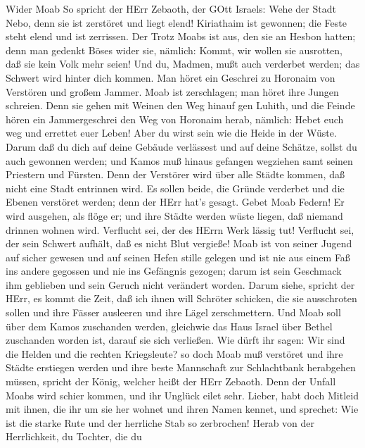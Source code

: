  Wider Moab So spricht der HErr Zebaoth, der GOtt Israels:
Wehe der Stadt Nebo, denn sie ist zerstöret und liegt elend! Kiriathaim
ist gewonnen; die Feste steht elend und ist zerrissen.  Der
Trotz Moabs ist aus, den sie an Hesbon hatten; denn man gedenkt Böses
wider sie, nämlich: Kommt, wir wollen sie ausrotten, daß sie kein Volk
mehr seien! Und du, Madmen, mußt auch verderbet werden; das Schwert wird
hinter dich kommen.  Man höret ein Geschrei zu Horonaim von
Verstören und großem Jammer.  Moab ist zerschlagen; man
höret ihre Jungen schreien.  Denn sie gehen mit Weinen den
Weg hinauf gen Luhith, und die Feinde hören ein Jammergeschrei den Weg
von Horonaim herab,  nämlich: Hebet euch weg und errettet
euer Leben! Aber du wirst sein wie die Heide in der Wüste. 
Darum daß du dich auf deine Gebäude verlässest und auf deine Schätze,
sollst du auch gewonnen werden; und Kamos muß hinaus gefangen wegziehen
samt seinen Priestern und Fürsten.  Denn der Verstörer wird
über alle Städte kommen, daß nicht eine Stadt entrinnen wird. Es sollen
beide, die Gründe verderbet und die Ebenen verstöret werden; denn der
HErr hat's gesagt.  Gebet Moab Federn! Er wird ausgehen, als
flöge er; und ihre Städte werden wüste liegen, daß niemand drinnen
wohnen wird.  Verflucht sei, der des HErrn Werk lässig tut!
Verflucht sei, der sein Schwert aufhält, daß es nicht Blut vergieße!
 Moab ist von seiner Jugend auf sicher gewesen und auf
seinen Hefen stille gelegen und ist nie aus einem Faß ins andere
gegossen und nie ins Gefängnis gezogen; darum ist sein Geschmack ihm
geblieben und sein Geruch nicht verändert worden.  Darum
siehe, spricht der HErr, es kommt die Zeit, daß ich ihnen will Schröter
schicken, die sie ausschroten sollen und ihre Fässer ausleeren und ihre
Lägel zerschmettern.  Und Moab soll über dem Kamos
zuschanden werden, gleichwie das Haus Israel über Bethel zuschanden
worden ist, darauf sie sich verließen.  Wie dürft ihr
sagen: Wir sind die Helden und die rechten Kriegsleute?  so
doch Moab muß verstöret und ihre Städte erstiegen werden und ihre beste
Mannschaft zur Schlachtbank herabgehen müssen, spricht der König,
welcher heißt der HErr Zebaoth.  Denn der Unfall Moabs wird
schier kommen, und ihr Unglück eilet sehr.  Lieber, habt
doch Mitleid mit ihnen, die ihr um sie her wohnet und ihren Namen
kennet, und sprechet: Wie ist die starke Rute und der herrliche Stab so
zerbrochen!  Herab von der Herrlichkeit, du Tochter, die du
